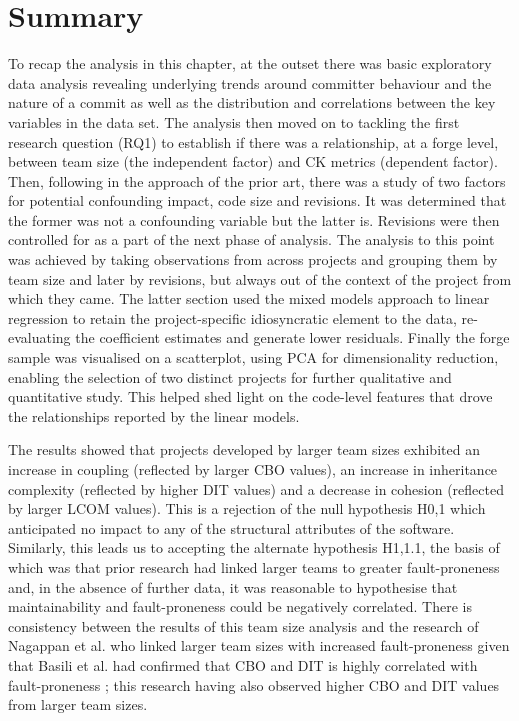 \section{Summary} %
To recap the analysis in this chapter, at the outset there was basic exploratory data analysis revealing underlying trends around committer behaviour and the nature of a commit as well as the distribution and correlations between the key variables in the data set. The analysis then moved on to tackling the first research question (RQ1) to establish if there was a relationship, at a forge level, between team size (the independent factor) and CK metrics (dependent factor). Then, following in the approach of the prior art, there was a study of two factors for potential confounding impact, code size and revisions. It was determined that the former was not a confounding variable but the latter is. Revisions were then controlled for as a part of the next phase of analysis. The analysis to this point was achieved by taking observations from across projects and grouping them by team size and later by revisions, but always out of the context of the project from which they came. The latter section used the mixed models approach to linear regression to retain the project-specific idiosyncratic element to the data, re-evaluating the coefficient estimates and generate lower residuals. Finally the forge sample was visualised on a scatterplot, using PCA for dimensionality reduction, enabling the selection of two distinct projects for further qualitative and quantitative study. This helped shed light on the code-level features that drove the relationships reported by the linear models.

The results showed that projects developed by larger team sizes exhibited an increase in coupling (reflected by larger CBO values), an increase in inheritance complexity (reflected by higher DIT values) and a decrease in cohesion (reflected by larger LCOM values). This is a rejection of the null hypothesis H0,1 which anticipated no impact to any of the structural attributes of the software. Similarly, this leads us to accepting the alternate hypothesis H1,1.1, the basis of which was that prior research had linked larger teams to greater fault-proneness and, in the absence of further data, it was reasonable to hypothesise that maintainability and fault-proneness could be negatively correlated. There is consistency between the results of this team size analysis and the research of Nagappan et al. \citep{nagappan2008influence} who linked larger team sizes with increased fault-proneness given that Basili et al. had confirmed that CBO and DIT is highly correlated with fault-proneness \citep{basili1996validation}; this research having also observed higher CBO and DIT values from larger team sizes.

